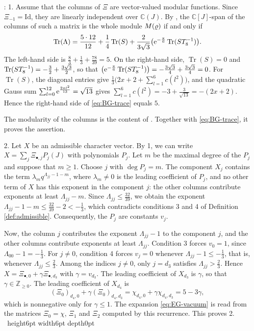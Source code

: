 \documentclass[leqno]{article}
\newcommand{\Cbb}{\ensuremath{\mathbb{C}}}
\let\cal\relax
\newcommand{\cal}{\mathcal}
\newcommand{\Z}{\ensuremath{\mathbb{Z}}}
\newcommand{\Id}{\mathrm{Id}}
\renewcommand{\leq}{\ensuremath{\leqslant}}
\renewcommand{\geq}{\ensuremath{\geqslant}}
\newcommand{\qed}{\hfill \vrule height6pt  width6pt depth0pt}
\let\i\relax
\newcommand{\i}{\mathrm{i}}
\newcommand{\e}{\mathrm{e}}
\DeclareMathOperator{\Tr}{Tr}
\let\Re\relax
\DeclareMathOperator{\Re}{Re}
\newenvironment{proof}[1][]{\noindent {\it Proof #1} : }{\hbox{~}\qed
\smallskip
}
\numberwithin{equation}{section}
\begin{document}
\begin{proof}
1. Assume that the columns of $\Xi$ are vector-valued modular functions. Since $\Xi_{-1} = \Id$, they are linearly independent over $\Cbb(J)$. By \cite[equation (2.22) p.~6]{BaG07}, the $\Cbb[J]$-span of the columns of such a matrix is the whole module $\cal M(\varrho)$ if and only if
\begin{equation}
\label{eq:BG-trace}
\Tr(\Lambda) = \frac{5\cdot 12}{12}+\frac{1}{4}\Tr(S)+\frac{2}{3\sqrt 3}\Re\big(\e^{-\frac{\pi\i}{6}}\Tr(ST_8^{-1})\big).
\end{equation}
The left-hand side is $\frac{8}{3}+\frac{1}{3}+\frac{78}{39} = 5$. On the right-hand side, $\Tr(S) = 0$ and $\Tr(ST_8^{-1}) = -\frac{3}{2}+\frac{3\sqrt 3}{2}\i$, so that $\Re\big(\e^{-\frac{\pi\i}{6}}\Tr(ST_8^{-1})\big) = -\frac{3\sqrt 3}{4}+\frac{3\sqrt 3}{4} = 0$. For $\Tr(S)$, the diagonal entries give $\frac{1}{3}\big(2x+2+\sum_{l = 1}^6c(l^2)\big)$, and the quadratic Gauss sum $\sum_{l = 0}^{12}\e^{\frac{2\pi\i l^2}{13}} = \sqrt{13}$ gives $\sum_{l = 1}^6c(l^2) = -3+\frac{3}{\sqrt{13}} = -(2x+2)$. Hence the right-hand side of \eqref{eq:BG-trace} equals $5$. 

The modularity of the columns is the content of \cite[Section 2.4]{EvG11}. Together with \eqref{eq:BG-trace}, it proves the assertion.

2. Let $X$ be an admissible character vector. By 1, we can write $X = \sum_j\Xi_{\bullet,j}P_j(J)$ with polynomials $P_j$. Let $m$ be the maximal degree of the $P_j$ and suppose that $m \geq 1$. Choose $j$ with $\deg P_j = m$. The component $X_j$ contains the term $\lambda_mq^{\Lambda_{jj}-1-m}$, where $\lambda_m \neq 0$ is the leading coefficient of $P_j$, and no other term of $X$ has this exponent in the component $j$: the other columns contribute exponents at least $\Lambda_{jj}-m$. Since $\Lambda_{jj} \leq \frac{32}{39}$, we obtain the exponent $\Lambda_{jj}-1-m \leq \frac{32}{39}-2 < -\frac{1}{3}$, which contradicts conditions 3 and 4 of Definition \ref{def:admissible}. Consequently, the $P_j$ are constants $v_j$.

Now, the column $j$ contributes the exponent $\Lambda_{jj}-1$ to the component $j$, and the other columns contribute exponents at least $\Lambda_{jj}$. Condition 3 forces $v_0 = 1$, since $\Lambda_{00}-1 = -\frac13$. For $j \neq 0$, condition 4 forces $v_j = 0$ whenever $\Lambda_{jj}-1 \leq -\frac{1}{3}$, that is, whenever $\Lambda_{jj} \leq \frac{2}{3}$. Among the indices $j \neq 0$, only $j = d_3$ satisfies $\Lambda_{jj} > \frac{2}{3}$. Hence $X = \Xi_{\bullet,0}+\gamma\Xi_{\bullet,d_3}$ with $\gamma = v_{d_3}$. The leading coefficient of $X_{d_3}$ is $\gamma$, so that $\gamma \in \Z_{\geq 0}$. The leading coefficient of $X_{d_4}$ is
\[
(\Xi_0)_{d_4,0}+\gamma(\Xi_0)_{d_4,d_3} = \chi_{d_4,0}+\gamma\chi_{d_4,d_3} = 5-3\gamma,
\]
which is nonnegative only for $\gamma \leq 1$. The expansion \eqref{eq:EG-vacuum} is read from the matrices $\Xi_0 = \chi$, $\Xi_1$ and $\Xi_2$ computed by this recurrence. This proves 2.
\end{proof}
\end{document}
